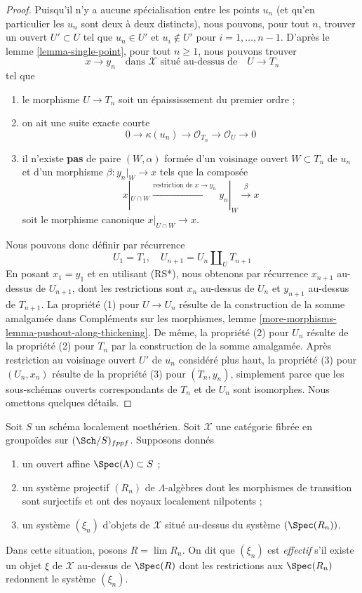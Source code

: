 \begin{proof}
Puisqu'il n'y a aucune spécialisation entre les points $u_n$ (et qu'en
particulier les $u_n$ sont deux à deux distincts), nous pouvons, pour tout
$n$, trouver un ouvert $U' \subset U$ tel que $u_n \in U'$ et
$u_i \not \in U'$ pour $i = 1, \ldots, n - 1$. D'après le lemme
\ref{lemma-single-point}, pour tout $n \geq 1$, nous pouvons trouver
$$
x \to y_n
\quad\text{dans }\mathcal{X}\text{ situé au-dessus de}\quad
U \to T_n
$$
tel que
\begin{enumerate}
\item le morphisme $U \to T_n$ soit un épaississement du premier ordre ;
\item on ait une suite exacte courte
$$
0 \to \kappa(u_n) \to \mathcal{O}_{T_n} \to \mathcal{O}_U \to 0
$$
\item il n'existe {\bf pas} de paire $(W, \alpha)$ formée d'un voisinage
ouvert $W \subset T_n$ de $u_n$ et d'un morphisme
$\beta : y_n|_W \to x$ tels que la composée
$$
x|_{U \cap W} \xrightarrow{\text{restriction de }x \to y_n}
y_n|_W \xrightarrow{\beta} x
$$
soit le morphisme canonique $x|_{U \cap W} \to x$.
\end{enumerate}
Nous pouvons donc définir par récurrence
$$
U_1 = T_1, \quad
U_{n + 1} = U_n \amalg_U T_{n + 1}
$$
En posant $x_1 = y_1$ et en utilisant (RS*), nous obtenons par récurrence
$x_{n + 1}$ au-dessus de $U_{n + 1}$, dont les restrictions sont $x_n$
au-dessus de $U_n$ et $y_{n + 1}$ au-dessus de $T_{n + 1}$.
La propriété (1) pour $U \to U_n$ résulte de la construction de la somme
amalgamée dans Compléments sur les morphismes, lemme
\ref{more-morphisms-lemma-pushout-along-thickening}.
De même, la propriété (2) pour $U_n$ résulte de la propriété (2) pour $T_n$
par la construction de la somme amalgamée. Après restriction au voisinage
ouvert $U'$ de $u_n$ considéré plus haut, la propriété (3) pour $(U_n, x_n)$
résulte de la propriété (3) pour $(T_n, y_n)$, simplement parce que les
sous-schémas ouverts correspondants de $T_n$ et de $U_n$ sont isomorphes.
Nous omettons quelques détails.
\end{proof}

\begin{remark}
\label{remark-strong-effectiveness}
Soit $S$ un schéma localement noethérien. Soit $\mathcal{X}$ une catégorie
fibrée en groupoïdes sur $(\Sch/S)_{fppf}$. Supposons donnés
\begin{enumerate}
\item un ouvert affine $\Spec(\Lambda) \subset S$ ;
\item un système projectif $(R_n)$ de $\Lambda$-algèbres dont les morphismes
de transition sont surjectifs et ont des noyaux localement nilpotents ;
\item un système $(\xi_n)$ d'objets de $\mathcal{X}$ situé au-dessus du
système $(\Spec(R_n))$.
\end{enumerate}
Dans cette situation, posons $R = \lim R_n$. On dit que $(\xi_n)$ est
{\it effectif} s'il existe un objet $\xi$ de $\mathcal{X}$ au-dessus de
$\Spec(R)$ dont les restrictions aux $\Spec(R_n)$ redonnent le système
$(\xi_n)$.
\end{remark}

